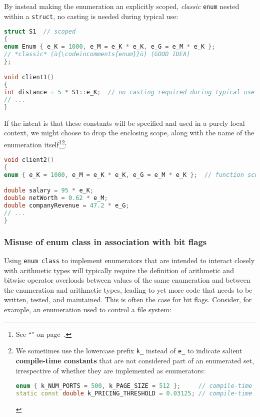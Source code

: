 \noindent By instead making the enumeration an explicitly scoped, \emph{classic}
\texttt{enum} nested within a \texttt{struct}, no casting is needed
during typical use:

\begin{lstlisting}[language=C++]
struct S1  // scoped
{
enum Enum { e_K = 1000, e_M = e_K * e_K, e_G = e_M * e_K };
// *classic* (ù{\codeincomments{enum}}ù) (GOOD IDEA)
};

void client1()
{
int distance = 5 * S1::e_K;  // no casting required during typical use
// ...
}
\end{lstlisting}

\noindent If the intent is that these constants will be specified and used in a
purely local context, we might choose to drop the enclosing scope, along
with the name of the enumeration itself\footnote{See
``" on page~\pageref{local-types-as-template-arguments}.}{\cprotect\footnote{We sometimes use the
lowercase prefix \texttt{k\_} instead of \texttt{e\_} to indicate
salient \textbf{compile-time constants} that are not considered part
of an enumerated set, irrespective of whether they are implemented as
enumerators:

\begin{lstlisting}[language=C++, basicstyle={\ttfamily\footnotesize}]
enum { k_NUM_PORTS = 500, k_PAGE_SIZE = 512 };     // compile-time constants
static const double k_PRICING_THRESHOLD = 0.03125; // compile-time constant
\end{lstlisting}
}}:

\begin{lstlisting}[language=C++]
void client2()
{
enum { e_K = 1000, e_M = e_K * e_K, e_G = e_M * e_K };  // function scoped

double salary = 95 * e_K;
double netWorth = 0.62 * e_M;
double companyRevenue = 47.2 * e_G;
// ...
}
\end{lstlisting}


\subsubsection[Misuse of {\tt enum} {\tt class} in association with bit flags]{Misuse of {\SubsubsecCode enum} {\SubsubsecCode class} in association with bit flags}\label{misuse-of-enum-class-in-association-with-bit-flags}

Using \texttt{enum}~\texttt{class} to implement enumerators that are
intended to interact closely with arithmetic types will typically
require the definition of arithmetic and bitwise operator overloads
between values of the same enumeration and between the enumeration and
arithmetic types, leading to yet more code that needs to be written,
tested, and maintained. This is often the case for bit flags. Consider, for example, an
enumeration used to control a file system:

